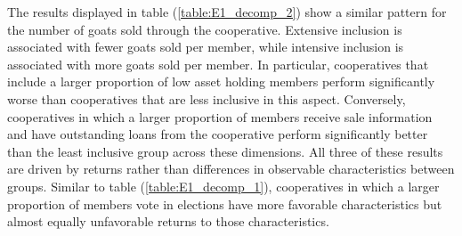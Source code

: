 \documentclass[11pt]{article}
\begin{document}
The results displayed in table (\ref{table:E1_decomp_2}) show a similar pattern for the number of goats sold through the cooperative. Extensive inclusion is associated with fewer goats sold per member, while intensive inclusion is associated with more goats sold per member. In particular, cooperatives that include a larger proportion of low asset holding members perform significantly worse than cooperatives that are less inclusive in this aspect. Conversely, cooperatives in which a larger proportion of members receive sale information and have outstanding loans from the cooperative perform significantly better than the least inclusive group across these dimensions. All three of these results are driven by returns rather than differences in observable characteristics between groups. Similar to table (\ref{table:E1_decomp_1}), cooperatives in which a larger proportion of members vote in elections have more favorable characteristics but almost equally unfavorable returns to those characteristics. 
\end{document}
